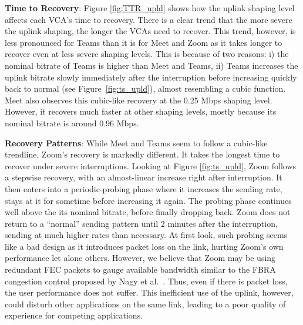 \textbf{Time to Recovery}: Figure \ref{fig:TTR_upld} shows how the uplink shaping level affects each VCA's time to recovery. There is a clear trend that the more severe the uplink shaping, the longer the VCAs need to recover. This trend, however, is less pronounced for Teams than it is for Meet and Zoom as it takes longer to recover even at less severe shaping levels. This is because of two reasons: i) the nominal bitrate of Teams is higher than Meet and Teams, ii)  Teams increases the uplink bitrate slowly immediately after the interruption before increasing quickly back to normal (see  Figure~\ref{fig:ts_upld}), almost resembling a cubic function. Meet also observes this cubic-like recovery at the 0.25 Mbps shaping level. However, it recovers much faster at other shaping levels, mostly because its nominal bitrate is around 0.96 Mbps. 

\textbf{Recovery Patterns}: While Meet and Teams seem to follow a cubic-like trendline, Zoom's recovery is markedly different. It takes the longest time to recover under severe interruptions. Looking at Figure \ref{fig:ts_upld}, Zoom follows a stepwise recovery, with an almost-linear increase right after interruption. It then enters into a periodic-probing phase where it increases the sending rate, stays at it for sometime before increasing it again. The probing phase continues well above the its nominal bitrate, before finally dropping back. Zoom does not return to a ``normal'' sending pattern until 2 minutes after the interruption, sending at much higher rates than necessary. At first look, such probing seems like a bad design as it introduces packet loss on the link, hurting Zoom's own performance let alone others. However, we believe that Zoom may be using redundant FEC packets to gauge available bandwidth similar to the FBRA congestion control proposed by Nagy et al.~\cite{nagy2014congestion}. Thus, even if there is packet loss, the user performance does not suffer. This inefficient use of the uplink, however, could disturb other applications on the same link, leading to a poor quality of experience for competing applications. 

